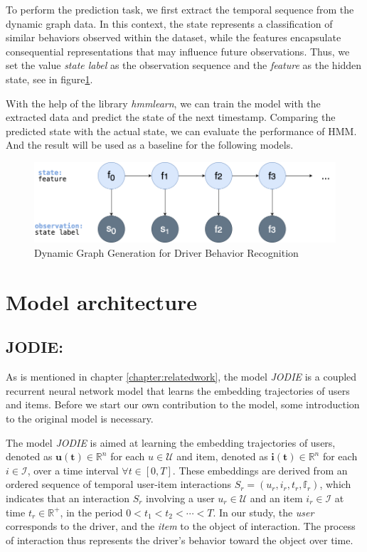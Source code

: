 To perform the prediction task, we first extract the temporal sequence from the dynamic graph data. In this context, the state represents a classification of similar behaviors observed within the dataset, while the features encapsulate consequential representations that may influence future observations. Thus, we set the value \textit{state label} as the observation sequence and the \textit{feature} as the hidden state, see in figure\ref{fig:HMMmodel}.

With the help of the library \textit{hmmlearn}, we can train the model with the extracted data and predict the state of the next timestamp. Comparing the predicted state with the actual state, we can evaluate the performance of HMM. And the result will be used as a baseline for the following models.
\begin{figure}[h]
    \centering
    \includegraphics[width=0.8\linewidth]{figures/04_HMMmodel.png}
    \caption{Dynamic Graph Generation for Driver Behavior Recognition}
    \label{fig:HMMmodel}
\end{figure}


\section{Model architecture}

\subsection{JODIE: }
As is mentioned in chapter \ref{chapter:relatedwork}, the model \textit{JODIE} is a coupled recurrent neural network model that learns the embedding trajectories of users and items. Before we start our own contribution to the model, some introduction to the original model is necessary.

The model \textit{JODIE} is aimed at learning the embedding trajectories of users, denoted as $\mathbf{u(t)} \in \mathbb{R} ^n$ for each $u \in \mathcal{U}$ and item, denoted as $\mathbf{i(t)} \in \mathbb{R} ^n$ for each $i \in \mathcal{I} $, over a time interval $\forall t \in [0,T] $. These embeddings are derived from an ordered sequence of temporal user-item interactions $S_r=(u_r,i_r,t_r,\mathbb{f}_r)$, which indicates that an interaction $S_r$ involving a user $u_r \in \mathcal{U} $ and an item $i_r \in \mathcal{I} $ at time $t_r \in \mathbb{R} ^+$, in the period $0 < t_1 < t_2< \cdots  < T$. In our study, the \textit{user} corresponds to the driver, and the \textit{item} to the object of interaction. The process of interaction thus represents the driver’s behavior toward the object over time.

